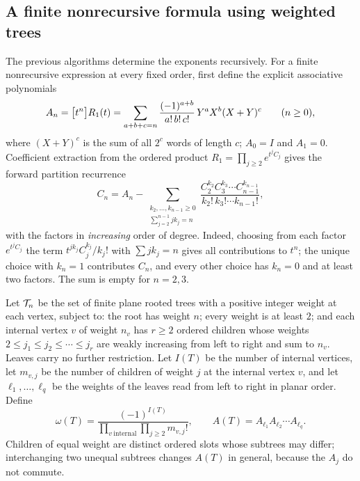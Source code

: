 \subsection{A finite nonrecursive formula using weighted trees}
The previous algorithms determine the exponents recursively. For a finite
nonrecursive expression at every fixed order, first define the explicit
associative polynomials
\begin{equation}\label{eq:An}
 A_n=\bigl[t^n\bigr]R_1(t)=\sum_{a+b+c=n}\frac{(-1)^{a+b}}{a!\,b!\,c!}\,Y^aX^b(X+Y)^c
 \qquad(n\geq0),
\end{equation}
where $(X+Y)^c$ is the sum of all $2^c$ words of length $c$; $A_0=I$ and
$A_1=0$. Coefficient extraction from the ordered product
$R_1=\prod_{j\geq2}e^{t^jC_j}$ gives the forward partition recurrence
\begin{equation}\label{eq:Cpartitions}
 C_n=A_n-\sum_{\substack{k_2,\ldots,k_{n-1}\geq0\\\sum_{j=2}^{n-1}jk_j=n}}
 \frac{C_2^{k_2}C_3^{k_3}\cdots C_{n-1}^{k_{n-1}}}{k_2!\,k_3!\cdots k_{n-1}!},
\end{equation}
with the factors in \emph{increasing} order of degree. Indeed, choosing
from each factor $e^{t^jC_j}$ the term $t^{jk_j}C_j^{k_j}/k_j!$ with
$\sum jk_j=n$ gives all contributions to $t^n$; the unique choice with
$k_n=1$ contributes $C_n$, and every other choice has $k_n=0$ and at
least two factors. The sum is empty for $n=2,3$.

\begin{definition}\label{def:trees}
Let $\mathcal{T}_n$ be the set of finite plane rooted trees with a positive integer
weight at each vertex, subject to: the root has weight $n$; every weight is
at least $2$; and each internal vertex $v$ of weight $n_v$ has $r\geq2$
ordered children whose weights $2\leq j_1\leq j_2\leq\cdots\leq j_r$ are
weakly increasing from left to right and sum to $n_v$. Leaves carry no
further restriction. Let $I(T)$ be the number of internal vertices, let
$m_{v,j}$ be the number of children of weight $j$ at the internal vertex
$v$, and let $\ell_1,\ldots,\ell_q$ be the weights of the leaves read from
left to right in planar order. Define
\begin{equation}\label{eq:treeweight}
 \omega(T)=\frac{(-1)^{I(T)}}{\prod_{v\ \mathrm{internal}}\prod_{j\geq2}m_{v,j}!},
 \qquad
 A(T)=A_{\ell_1}A_{\ell_2}\cdots A_{\ell_q}.
\end{equation}
Children of equal weight are distinct ordered slots whose subtrees may
differ; interchanging two unequal subtrees changes $A(T)$ in general,
because the $A_j$ do not commute.
\end{definition}

